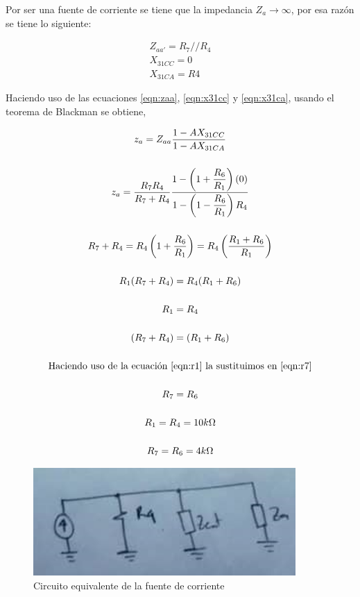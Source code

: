 \begin{enumerate}[label=\textbf{\arabic*.}, font=\bfseries]
\begin{itemize}
            Por ser una fuente de corriente se tiene que la impedancia $Z_a\to \infty$, por esa razón se tiene lo siguiente:

            \begin{gather}
                Z_{aa'}=R_7//R_4 \label{eqn:zaa}\\[0.5cm]
                X_{31CC}=0 \label{eqn:x31cc}\\[0.5cm]
                X_{31CA}=R4 \label{eqn:x31ca}
            \end{gather}

            Haciendo uso de las ecuaciones \ref{eqn:zaa}, \ref{eqn:x31cc} y \ref{eqn:x31ca}, usando el teorema de Blackman se obtiene,

            \begin{gather}
                z_a=Z_{aa}\dfrac{1-AX_{31CC}}{1-AX_{31CA}} \nonumber\\[0.5cm]
                z_a=\dfrac{R_7R_4}{R_7+R_4}\dfrac{1-\left(1+\dfrac{R_6}{R_1}\right)(0)}{1-\left(1-\dfrac{R_6}{R_1}\right)R_4} \label{eqn:za}\\[0.5cm]
                R_7+R_4=R_4\left(1+\dfrac{R_6}{R_1}\right)=R_4\left(\dfrac{R_1+R_6}{R_1}\right) \nonumber\\[0.5cm]
                R_1(R_7+R_4)=R_4(R_1+R_6) \nonumber\\[0.5cm]
                R_1=R_4 \label{eqn:r1}\\[0.5cm]
                (R_7+R_4)=(R_1+R_6) \label{eqn:r7}\\[0.5cm]
                \text{Haciendo uso de la ecuación \ref{eqn:r1} la sustituimos en \ref{eqn:r7}}\nonumber\\[0.5cm]
                R_7=R_6\\[0.5cm]
                R_1=R_4=10k\ohm \nonumber\\[0.5cm]
                R_7=R_6=4k\ohm \nonumber
            \end{gather}

            \begin{figure}[H]
              \centering
              \renewcommand{\figurename}{Imagen}
              \includegraphics[width=10cm]{Imagenes/fuente_eq.png}
              \caption{Circuito equivalente de la fuente de corriente}
              \label{fig:fuenteeq}
            \end{figure}


\end{itemize}
\end{enumerate}
